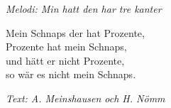 {\footnotesize\textit{Melodi: Min hatt den har tre kanter}}\par
\vspace{10pt}
Mein Schnaps der hat Prozente,\\
Prozente hat mein Schnaps,\\
und hätt er nicht Prozente,\\
so wär es nicht mein Schnaps.
\par
\vspace{10pt}
{\footnotesize\textit{Text: A. Meinshausen och H. Nömm}}
